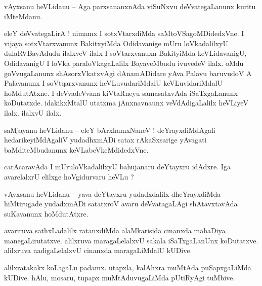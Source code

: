 \documentclass{article}
\begin{document}
\begin{mng}%
vAyxsanu heVLidanu -- Aga parxsananxnAda viSuNxvu deVvategaLanunx kuritu iMteMdanu.
\end{mng}

\begin{mng}%
eleY deVvategaLirA ! nimamx I sotxVtarxdiMda saMtoVSagoMDidedxVne. I vijaya sotxVtarxvanunx 
BakitxyiMda Odidavanige mUru loVkadalilxyU dulaRVBavAdudu ilalxveV ilalx I soVtarxvanuxn 
BakityiMda keVLidavanigU, OdidavanigU I loVka paraloVkagaLalilx BayaveMbudu ivuvedeV ilalx. oMdu 
goVvugaLanunx shAsorxVkatxvAgi dAnamADidare yAva Palavu baruvudoV A Palavanunx I soVtqarxvanunx 
heVLuvudariMdalU keVLuvidariMdalU hoMdutAtxne. I deVvadeVvana kiVtaRneyu samasatxvAda 
iSaTxgaLanunx koDutatxde. idakikxMtalU utatxma jAnxnavnaunx veVdAdigaLalilx heVLiyeV ilalx. 
ilalxvU ilalx.
\end{mng}


\begin{mng}%
saMjayanu heVLidanu -- eleY bArxhamxNaneV ! deYrayxdiMdAgali hedarikeyiMdAgaliV yudadhxmADi satax 
rAkaSxsarige yAvagati baMditeMbudanunx keVLabeVkeMdidedxVne.
\end{mng}

\begin{mng}%
carAcaravAda I mUruloVkadalilxyU bahujanaru deYtayxru idAdxre. Iga avarelalxrU elilxge hoVgidurvaru 
heVLu ?
\end{mng}

\begin{mng}%
vAyxsanu heVLidanu -- yava deYtayxru yudadxdalilx dheYrayxdiMda hiMtirugade yudadxmADi satatxroV 
avaru deVvatagaLAgi shAtavxtavAda suKavanunx hoMdutAtxre.
\end{mng}

\begin{mng}%
avariruva sathxLadalilx ratanxdiMda alaMkarisida cinanxda mahaDiya manegaLirutatxve. alilxruva 
maragaLelalxvU sakala iSaTxgaLanUnx koDutatxve. alilxruva nadigaLelalxvU cinanxda maragaLiMdalU 
kUDive.
\end{mng}

\begin{mng}%
alilxratakakx koLagaLu padamx. utapxla, kalAhxra muMtAda puSapxgaLiMda kUDive. hAlu, mosaru, tupapx 
muMtAduvugaLiMda pUtiRyAgi tuMbive.
\end{mng}
\end{document}
